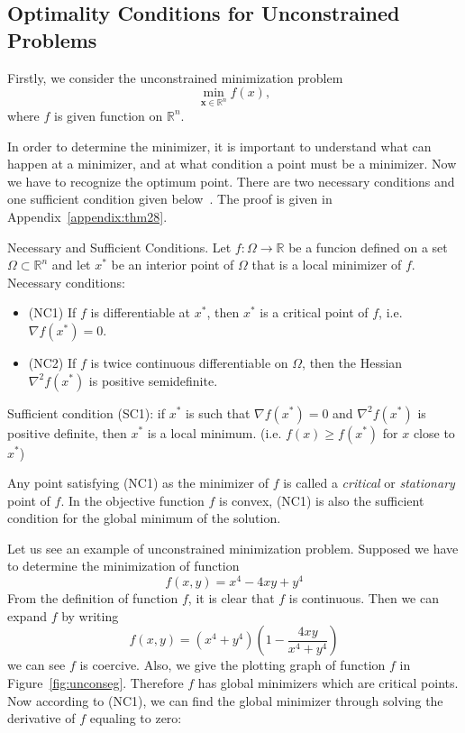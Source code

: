 \subsection{Optimality Conditions for Unconstrained Problems}
Firstly, we consider the unconstrained minimization problem
$$
\min _{\mathbf{x} \in \mathbb{R}^{n}} f(x),
$$
where $f$ is given function on $\mathbb{R}^n$. 
\par In order to determine the minimizer, it is important to understand what can happen at a minimizer, and at what condition a point must be a minimizer. Now we have to recognize the optimum point. There are two necessary conditions and one sufficient condition given below~\citep{JS:06}. The proof is given in Appendix~\ref{appendix:thm28}.
\begin{thm}{Necessary and Sufficient Conditions.}
    \label{thm28}
    Let $f:\Omega \rightarrow \mathbb{R}$ be a funcion defined on a set $\Omega \subset \mathbb{R}^n$ and let $x^*$ be an interior point of $\Omega$ that is a local minimizer of $f$. \\
    Necessary conditions:
    \begin{itemize}
        \item (NC1) If $f$ is differentiable at $x^*$, then $x^*$ is a critical point of $f$, i.e. $\nabla f\left(x^{*}\right)=0$.
        \item (NC2) If $f$ is twice continuous differentiable on $\Omega$, then the Hessian $\nabla^2 f\left(x^{*}\right)$ is positive semidefinite.
    \end{itemize}
    Sufficient condition (SC1): if $x^*$ is such that $\nabla f\left(x^{*}\right)=0$ and $\nabla^2 f\left(x^{*}\right)$ is positive definite, then $x^*$ is a local minimum. (i.e. $f(x) \geq f(x^*)$ for $x$ close to $x^*$)
\end{thm}
\par Any point satisfying (NC1) as the minimizer of $f$ is called a \emph{critical} or \emph{stationary} point of $f$. In the objective function $f$ is convex, (NC1) is also the sufficient condition for the global minimum of the solution. 
\par Let us see an example of unconstrained minimization problem. Supposed we have to determine the minimization of function
$$
f(x, y)=x^{4}-4 x y+y^{4}
$$
From the definition of function $f$, it is clear that $f$ is continuous. Then we can expand $f$ by writing
$$
f(x, y)=\left(x^{4}+y^{4}\right)\left(1-\frac{4 x y}{x^{4}+y^{4}}\right)
$$
we can see $f$ is coercive. Also, we give the plotting graph of function $f$ in Figure~\ref{fig:unconseg}. Therefore $f$ has global minimizers which are critical points. Now according to (NC1), we can find the global minimizer through solving the derivative of $f$ equaling to zero:
